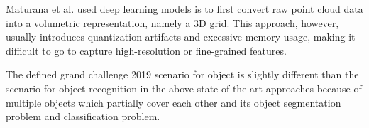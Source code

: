 Maturana et al. \cite{DBLP:conf/iros/MaturanaS15} used deep learning models is to first convert raw point cloud data into a volumetric 
representation, namely a 3D grid. This approach, however, usually introduces quantization artifacts and excessive memory usage, making it 
difficult to go to capture high-resolution or fine-grained features.


The defined grand challenge 2019 \cite{DEBSGC2019} scenario for object is slightly different than the scenario for object recognition in 
the above state-of-the-art approaches because of multiple objects which partially cover each other and its object segmentation problem and 
classification problem.       







